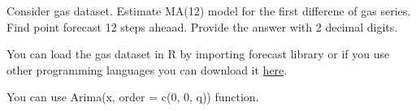 
\begin{question}
Consider gas dataset. Estimate MA(12) model for the first differene of gas series. Find point forecast 12 steps aheaad. Provide the answer with 2 decimal digits.

You can load the gas dataset in R by importing forecast library or if you use other programming languages you can download it \href{https://github.com/vincentarelbundock/Rdatasets/blob/master/csv/forecast/gas.csv}{here}.
\end{question}

\begin{solution}
You can use Arima(x, order = c(0, 0, q)) function.
\end{solution}

